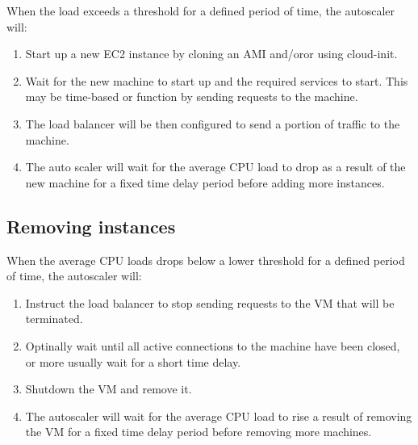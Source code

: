 \documentclass[slides]{pgnotes}
\begin{document}
When the load exceeds a threshold for a defined period of time, the autoscaler will:
\begin{enumerate}
\item Start up a new EC2 instance by cloning an AMI and/oror using cloud-init.
\item Wait for the new machine to start up and the required services to start. This may be time-based or function by sending requests to the machine.
\item The load balancer will be then configured to send a portion of traffic to the machine.
\item The auto scaler will wait for the average CPU load to drop as a result of the new machine for a fixed time delay period before adding more instances.
\end{enumerate}

\subsection{Removing instances}

When the average CPU loads drops below a lower threshold for a defined period of time, the autoscaler will:
\begin{enumerate}
\item Instruct the load balancer to stop sending requests to the VM that will be terminated.
\item Optinally wait until all active connections to the machine have been closed, or more usually wait for a short time delay.
\item Shutdown the VM and remove it.
\item The autoscaler will wait for the average CPU load to rise a result of removing the VM for a fixed time delay period before removing more machines.
\end{enumerate}
\end{document}
